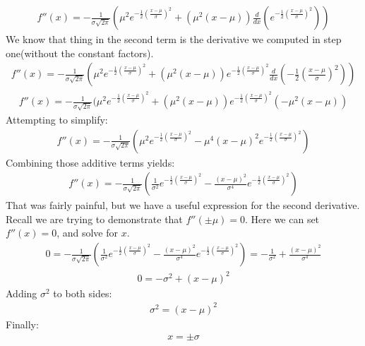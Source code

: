 \documentclass{article}
\begin{document}
\begin{align*}
f''(x) = -\frac{1}{\sigma \sqrt{2\pi}} (\mu^2 e^{-\frac{1}{2}(\frac{x-\mu}{\sigma})^2} + (\mu^2(x-\mu)) \frac{d}{dx} (e^{-\frac{1}{2}(\frac{x-\mu}{\sigma})^2}) )
\end{align*}
We know that thing in the second term is the derivative we computed in step one(without the constant factors).
\begin{align*}
f''(x) = -\frac{1}{\sigma \sqrt{2\pi}} (\mu^2 e^{-\frac{1}{2}(\frac{x-\mu}{\sigma})^2} + (\mu^2(x-\mu)) e^{-\frac{1}{2}(\frac{x-\mu}{\sigma})^2} \frac{d}{dx} (-\frac{1}{2}(\frac{x-\mu}{\sigma})^2) )
\end{align*}
\begin{align*}
f''(x) = -\frac{1}{\sigma \sqrt{2\pi}} (\mu^2 e^{-\frac{1}{2}(\frac{x-\mu}{\sigma})^2} + (\mu^2(x-\mu)) e^{-\frac{1}{2}(\frac{x-\mu}{\sigma})^2} (-\mu^2(x-\mu))
\end{align*}
Attempting to simplify:
\begin{align*}
f''(x) = -\frac{1}{\sigma \sqrt{2\pi}} (\mu^2 e^{-\frac{1}{2}(\frac{x-\mu}{\sigma})^2} - \mu^4(x-\mu)^2 e^{-\frac{1}{2}(\frac{x-\mu}{\sigma})^2} )
\end{align*}
Combining those additive terms yields:
\begin{align*}
f''(x) = -\frac{1}{\sigma \sqrt{2\pi}} (\frac{1}{\sigma^2} e^{-\frac{1}{2}(\frac{x-\mu}{\sigma})^2} - \frac{(x-\mu)^2}{\sigma^4} e^{-\frac{1}{2}(\frac{x-\mu}{\sigma})^2})
\end{align*}
That was fairly painful, but we have a useful expression for the second derivative. Recall we are trying to demonstrate that $f''(\pm \mu)=0$. Here we can set $f''(x)=0$, and solve for $x$.
\begin{align*}
0 = -\frac{1}{\sigma \sqrt{2\pi}} (\frac{1}{\sigma^2} e^{-\frac{1}{2}(\frac{x-\mu}{\sigma})^2} - \frac{(x-\mu)^2}{\sigma^4} e^{-\frac{1}{2}(\frac{x-\mu}{\sigma})^2}) = -\frac{1}{\sigma^2} +\frac{(x-\mu)^2}{\sigma^4}
\end{align*}
\begin{align*}
0 = -\sigma^2 +(x-\mu)^2
\end{align*}
Adding $\sigma^2$ to both sides:
\begin{align*}
\sigma^2 = (x-\mu)^2
\end{align*}
Finally:
\begin{align*}
\boxed{x=\pm \sigma}
\end{align*}
\clearpage
\end{document}

